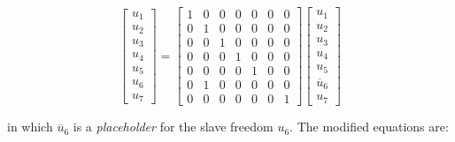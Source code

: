\documentclass[10pt,b5paper,titlepage]{book}
\begin{document}
\begin{equation}
    \begin{bmatrix}
        u_1 \\
        u_2 \\
        u_3 \\
        u_4 \\
        u_5 \\
        u_6 \\
        u_7
    \end{bmatrix}
    = \begin{bmatrix}
        1 & 0 & 0 & 0 & 0 & 0 & 0 \\
        0 & 1 & 0 & 0 & 0 & 0 & 0 \\
        0 & 0 & 1 & 0 & 0 & 0 & 0 \\
        0 & 0 & 0 & 1 & 0 & 0 & 0 \\
        0 & 0 & 0 & 0 & 1 & 0 & 0 \\
        0 & 1 & 0 & 0 & 0 & 0 & 0 \\
        0 & 0 & 0 & 0 & 0 & 0 & 1
    \end{bmatrix}
    \begin{bmatrix}
        u_1 \\
        u_2 \\
        u_3 \\
        u_4 \\
        u_5 \\
        \overline{u}_6 \\
        u_7
    \end{bmatrix}
\end{equation}

in which $ \overline{u}_6 $ is a \textit{placeholder} for the slave freedom $ u_6 $.
The modified equations are:
\end{document}

